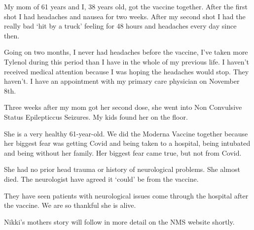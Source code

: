 My mom of 61 years and I, 38 years old, got the vaccine together. After the
first shot I had headaches and nausea for two weeks. After my second shot I had
the really bad ‘hit by a truck’ feeling for 48 hours and headaches every day
since then.

Going on two months, I never had headaches before the vaccine, I’ve taken more
Tylenol during this period than I have in the whole of my previous life. I
haven’t received medical attention because I was hoping the headaches would
stop. They haven’t. I have an appointment with my primary care physician on
November 8th.

Three weeks after my mom got her second dose, she went into Non Convulsive
Status Epilepticcus Seizures. My kids found her on the floor.

She is a very healthy 61-year-old. We did the Moderna Vaccine together because
her biggest fear was getting Covid and being taken to a hospital, being
intubated and being without her family. Her biggest fear came true, but not from
Covid.

She had no prior head trauma or history of neurological problems. She almost
died. The neurologist have agreed it ‘could’ be from the vaccine.

They have seen patients with neurological issues come through the hospital after
the vaccine. We are so thankful she is alive.

Nikki’s mothers story will follow in more detail on the NMS website shortly.

